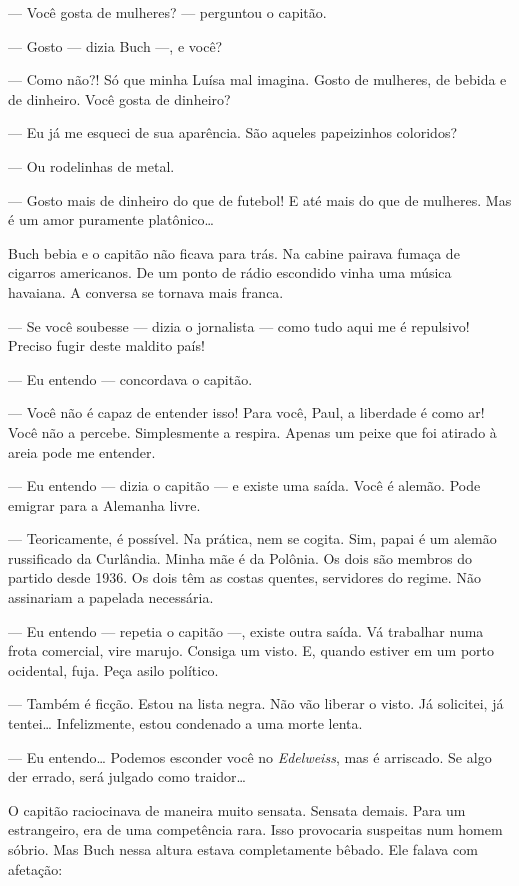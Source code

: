 --- Você gosta de mulheres? --- perguntou o capitão.

--- Gosto --- dizia Buch ---, e você?

--- Como não?! Só que minha Luísa mal imagina. Gosto de mulheres, de
bebida e de dinheiro. Você gosta de dinheiro?

--- Eu já me esqueci de sua aparência. São aqueles papeizinhos
coloridos?

--- Ou rodelinhas de metal.

--- Gosto mais de dinheiro do que de futebol! E até mais do que de
mulheres. Mas é um amor puramente platônico\ldots{}

Buch bebia e o capitão não ficava para trás. Na cabine pairava fumaça de
cigarros americanos. De um ponto de rádio escondido vinha uma música
havaiana. A conversa se tornava mais franca.

--- Se você soubesse --- dizia o jornalista --- como tudo aqui me é
repulsivo! Preciso fugir deste maldito país!

--- Eu entendo --- concordava o capitão.

--- Você não é capaz de entender isso! Para você, Paul, a liberdade é
como ar! Você não a percebe. Simplesmente a respira. Apenas um peixe que
foi atirado à areia pode me entender.

--- Eu entendo --- dizia o capitão --- e existe uma saída. Você é
alemão. Pode emigrar para a Alemanha livre.

--- Teoricamente, é possível. Na prática, nem se cogita. Sim, papai é um
alemão russificado da Curlândia. Minha mãe é da Polônia. Os dois são
membros do partido desde 1936. Os dois têm as costas quentes, servidores
do regime. Não assinariam a papelada necessária.

--- Eu entendo --- repetia o capitão ---, existe outra saída. Vá
trabalhar numa frota comercial, vire marujo. Consiga um visto. E, quando
estiver em um porto ocidental, fuja. Peça asilo político.

--- Também é ficção. Estou na lista negra. Não vão liberar o visto. Já
solicitei, já tentei\ldots{} Infelizmente, estou condenado a uma morte lenta.

--- Eu entendo\ldots{} Podemos esconder você no \emph{Edelweiss}, mas é
arriscado. Se algo der errado, será julgado como traidor\ldots{}

O capitão raciocinava de maneira muito sensata. Sensata demais. Para um
estrangeiro, era de uma competência rara. Isso provocaria suspeitas num
homem sóbrio. Mas Buch nessa altura estava completamente bêbado. Ele
falava com afetação:

